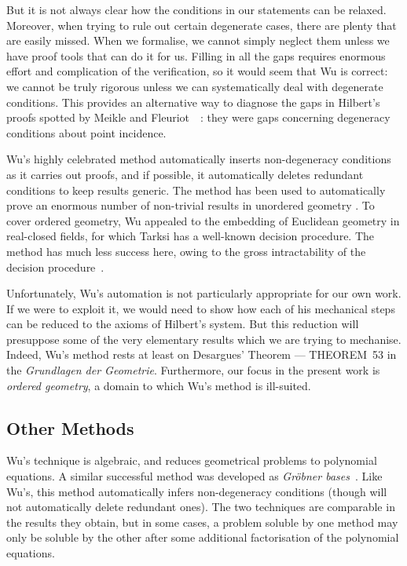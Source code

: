 But it is not always clear how the conditions in our statements can be relaxed. Moreover, when trying to rule out certain degenerate cases, there are plenty that are easily missed. When we formalise, we cannot simply neglect them unless we have proof tools that can do it for us. Filling in all the gaps requires enormous effort and complication of the verification, so it would seem that Wu is correct: we cannot be truly rigorous unless we can systematically deal with degenerate conditions. This provides an alternative way to diagnose the gaps in Hilbert's proofs spotted by Meikle and Fleuriot~~\cite{MeikleFleuriotFormalizingHilbert}: they were gaps concerning degeneracy conditions about point incidence.

Wu's highly celebrated method automatically inserts non-degeneracy conditions as it carries out proofs, and if possible, it automatically deletes redundant conditions to keep results generic. The method has been used to automatically prove an enormous number of non-trivial results in unordered geometry \cite{MechanicalGeometryTheoremProving}. To cover ordered geometry, Wu appealed to the embedding of Euclidean geometry in real-closed fields, for which Tarksi has a well-known decision procedure. The method has much less success here, owing to the gross intractability of the decision procedure~\cite{TarksiMcNaugtonReview}. 

Unfortunately, Wu's automation is not particularly appropriate for our own work. If we were to exploit it, we would need to show how each of his mechanical steps can be reduced to the axioms of Hilbert's system. But this reduction will presuppose some of the very elementary results which we are trying to mechanise. Indeed, Wu's method rests at least on Desargues' Theorem --- THEOREM~53 in the \emph{Grundlagen der Geometrie}. Furthermore, our focus in the present work is \emph{ordered geometry}, a domain to which Wu's method is ill-suited.

\subsection{Other Methods}
Wu's technique is algebraic, and reduces geometrical problems to polynomial equations. A similar successful method was developed as \emph{Gr\"{o}bner bases}~\cite{BuchbergerGrobner}. Like Wu's, this method automatically infers non-degeneracy conditions (though will not automatically delete redundant ones). The two techniques are comparable in the results they obtain, but in some cases, a problem soluble by one method may only be soluble by the other after some additional factorisation of the polynomial equations.

